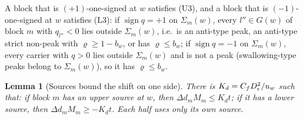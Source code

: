 \documentclass[10pt]{amsart}
\newtheorem{lemma}[theorem]{Lemma}
\theoremstyle{definition}
\theoremstyle{remark}
\newcommand{\sgn}{\operatorname{sign}}
\begin{document}
A block that is $(+1)$-one-signed at $w$ satisfies (U3), and a block that
is $(-1)$-one-signed at $w$ satisfies (L3): if $\sgn q=+1$ on
$\Sigma_m(w)$, every $l''\in G(w)$ of block $m$ with $q_{l''}<0$ lies
outside $\Sigma_m(w)$, i.e.\ is an anti-type peak, an anti-type strict
non-peak with $\varrho\ge1-b_w$, or has $\varrho\le b_w$; if $\sgn q=-1$ on
$\Sigma_m(w)$, every carrier with $q>0$ lies outside $\Sigma_m(w)$ and is
not a peak (swallowing-type peaks belong to $\Sigma_m(w)$), so it has
$\varrho\le b_w$.

\begin{lemma}[Sources bound the shift on one side]\label{lem:II-sources}
There is $K_d=C_fD_{\rm r}^2/u_w$ such that: if block $m$ has an upper
source at $w$, then $\Delta d_mM_m\le K_dt$; if it has a lower source, then
$\Delta d_mM_m\ge-K_dt$.  Each half uses only its own source.
\end{lemma}
\end{document}
